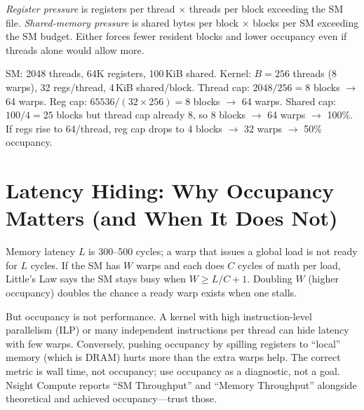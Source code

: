 \begin{definition}
\emph{Register pressure} is registers per thread $\times$ threads per block exceeding the SM file. \emph{Shared-memory pressure} is shared bytes per block $\times$ blocks per SM exceeding the SM budget. Either forces fewer resident blocks and lower occupancy even if threads alone would allow more.
\end{definition}

\begin{example}
SM: 2048 threads, 64K registers, 100\,KiB shared. Kernel: $B=256$ threads (8 warps), 32 regs/thread, 4\,KiB shared/block. Thread cap: $2048/256=8$ blocks $\to$ 64 warps. Reg cap: $65536/(32\times256)=8$ blocks $\to$ 64 warps. Shared cap: $100/4=25$ blocks but thread cap already 8, so 8 blocks $\to$ 64 warps $\to$ 100\%. If regs rise to 64/thread, reg cap drops to 4 blocks $\to$ 32 warps $\to$ 50\% occupancy.
\end{example}

\section{Latency Hiding: Why Occupancy Matters (and When It Does Not)}
\label{sec:latency-hiding}
Memory latency $L$ is 300--500 cycles; a warp that issues a global load is not ready for $L$ cycles. If the SM has $W$ warps and each does $C$ cycles of math per load, Little's Law says the SM stays busy when $W\ge L/C + 1$. Doubling $W$ (higher occupancy) doubles the chance a ready warp exists when one stalls.

But occupancy is not performance. A kernel with high instruction-level parallelism (ILP) or many independent instructions per thread can hide latency with few warps. Conversely, pushing occupancy by spilling registers to ``local'' memory (which is DRAM) hurts more than the extra warps help. The correct metric is wall time, not occupancy; use occupancy as a diagnostic, not a goal. Nsight Compute reports ``SM Throughput'' and ``Memory Throughput'' alongside theoretical and achieved occupancy---trust those.


